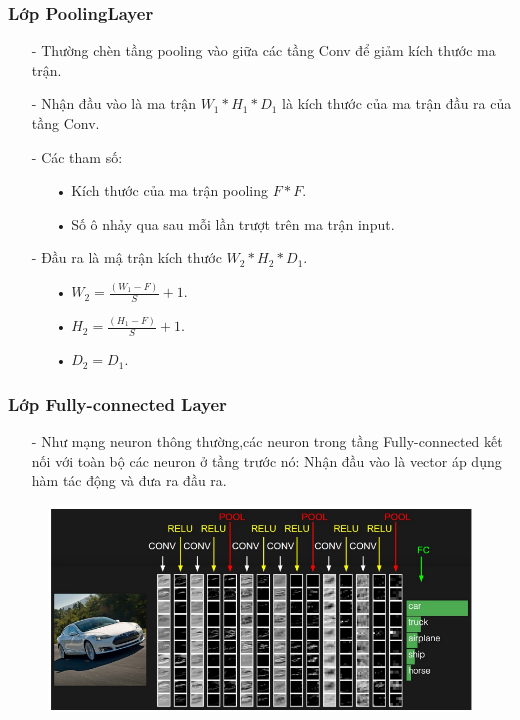 \documentclass[a4paper,12pt]{report}
\begin{document}
\subsubsection{Lớp PoolingLayer}
\begin{itemize}
\item[-] Thường chèn tầng pooling vào giữa các tầng Conv để giảm kích thước ma trận.
\item[-] Nhận đầu vào là ma trận $W_1*H_1*D_1$ là kích thước của ma trận đầu ra của tầng Conv.
\item[-] Các tham số:
\begin{itemize}
\item[•] Kích thước của ma trận pooling $F*F$.
\item[•] Số ô nhảy qua sau mỗi lần trượt trên ma trận input.
\end{itemize}
\item[-] Đầu ra là mậ trận kích thước $W_2*H_2*D_1$.
\begin{itemize}
\item[•] $W_2 = \frac{(W_1 - F)}{S} + 1$.
\item[•] $H_2 = \frac{(H_1 - F)}{S} + 1$.
\item[•] $D_2 = D_1$.
\end{itemize}
\end{itemize}
\subsubsection{Lớp Fully-connected Layer}
\begin{itemize}
\item[-] Như mạng neuron thông thường,các neuron trong tầng Fully-connected kết nối với toàn bộ các neuron ở tầng trước nó: Nhận đầu vào là vector áp dụng hàm tác động và đưa ra đầu ra.
\end{itemize}
\begin{figure}[h]
\begin{center}
\includegraphics[width =0.8 \textwidth]{ConvNetArchitecture.png}
\end{center}
\end{figure}
\end{document}
